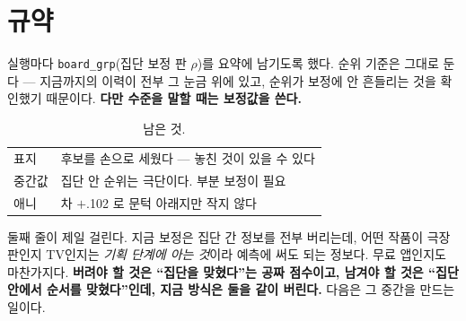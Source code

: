 \documentclass[10pt]{article}
\begin{document}

\section{규약}

실행마다 \texttt{board\_grp}(집단 보정 판 $\rho$)를 요약에 남기도록 했다.
순위 기준은 그대로 둔다 --- 지금까지의 이력이 전부 그 눈금 위에 있고,
순위가 보정에 안 흔들리는 것을 확인했기 때문이다. \textbf{다만 수준을
말할 때는 보정값을 쓴다.}

\begin{table}[t]
\centering\tsize
\caption{남은 것.}
\begin{tabular}{ll}
\toprule
표지 & 후보를 손으로 세웠다 --- 놓친 것이 있을 수 있다 \\
중간값 & 집단 안 순위는 극단이다. 부분 보정이 필요 \\
애니 & 차 $+$.102 로 문턱 아래지만 작지 않다 \\
\bottomrule
\end{tabular}
\end{table}

둘째 줄이 제일 걸린다. 지금 보정은 집단 간 정보를 전부 버리는데, 어떤
작품이 극장판인지 TV인지는 \emph{기획 단계에 아는 것}이라 예측에 써도
되는 정보다. 무료 앱인지도 마찬가지다. \textbf{버려야 할 것은 ``집단을
맞혔다''는 공짜 점수이고, 남겨야 할 것은 ``집단 안에서 순서를 맞혔다''인데,
지금 방식은 둘을 같이 버린다.} 다음은 그 중간을 만드는 일이다.
\end{document}

